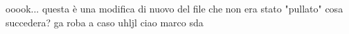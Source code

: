 \usepackage{pdfcomment}


    ooook... questa è una modifica di nuovo del file che non era stato "pullato" cosa succedera?
ga    roba a caso 
uhljl
ciao marco sda
    
